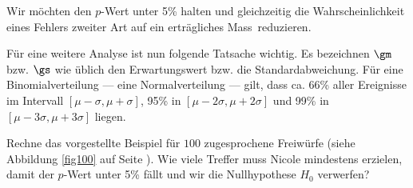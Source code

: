 \documentclass[%
11pt,%
twoside,%
titlepage,%
german,%
headsepline%
]{scrartcl}
\begin{document}
Wir möchten den $p$-Wert unter 5\% halten und gleichzeitig die Wahrscheinlichkeit eines Fehlers zweiter Art auf ein \glqq erträgliches Mass\grqq\ reduzieren.

\begin{bem}
Für eine weitere Analyse ist nun folgende Tatsache wichtig. Es bezeichnen $\gm$ bzw. $\gs$ wie üblich den Erwartungswert bzw. die Standardabweichung. Für eine Binomialverteilung --- eine Normalverteilung --- gilt, dass ca. 66\% aller Ereignisse im Intervall $[\mu-\sigma,\mu+\sigma]$, 95\% in $[\mu-2\sigma,\mu+2\sigma]$ und 99\% in $[\mu-3\sigma,\mu+3\sigma]$ liegen.
\end{bem}

\begin{ueb}
Rechne das vorgestellte Beispiel für $100$ zugesprochene Freiwürfe (siehe Abbildung \ref{fig100} auf Seite \pageref{fig100}). Wie viele Treffer muss Nicole mindestens erzielen, damit der $p$-Wert unter 5\% fällt und wir die Nullhypothese $H_0$ verwerfen?
\end{ueb}
\end{document}
